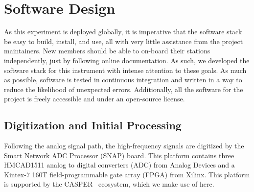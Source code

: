 \section{Software Design} \label{sec:software}

As this experiment is deployed globally, it is imperative that the software stack be easy to build, install, and use, all with very little assistance from the project maintainers.
New members should be able to on-board their stations independently, just by following online documentation.
As such, we developed the software stack for this instrument with intense attention to these goals.
As much as possible, software is tested in continuous integration and written in a way to reduce the likelihood of unexpected errors.
Additionally, all the software for the project is freely accessible and under an open-source license.

\subsection{Digitization and Initial Processing}

Following the analog signal path, the high-frequency signals are digitized by the Smart Network ADC Processor (SNAP) board.
This platform contains three HMCAD1511 analog to digital converters (ADC) from Analog Devices and a Kintex-7 160T field-programmable gate array (FPGA) from Xilinx.
This platform is supported by the CASPER~\cite{hickishDecadeDevelopingRadioAstronomy2016a} ecosystem, which we make use of here.

